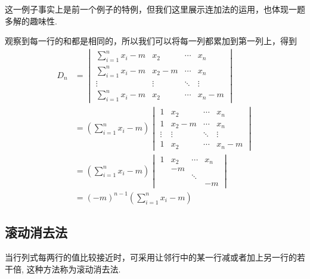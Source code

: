 这一例子事实上是前一个例子的特例，但我们这里展示连加法的运用，也体现一题多解的趣味性.

\begin{solution}
    观察到每一行的和都是相同的，所以我们可以将每一列都累加到第一列上，得到
    \begin{align*}
        D_n & =\begin{vmatrix}
                   \displaystyle\sum_{i=1}^{n} x_i-m & x_2    & \cdots & x_n    \\
                   \displaystyle\sum_{i=1}^{n} x_i-m & x_2-m  & \cdots & x_n    \\
                   \vdots                            & \vdots & \ddots & \vdots \\
                   \displaystyle\sum_{i=1}^{n} x_i-m & x_2    & \cdots & x_n-m
               \end{vmatrix} \\
            & =\left(\sum_{i=1}^{n} x_i-m\right)
        \begin{vmatrix}
            1      & x_2    & \cdots & x_n    \\
            1      & x_2-m  & \cdots & x_n    \\
            \vdots & \vdots & \ddots & \vdots \\
            1      & x_2    & \cdots & x_n-m
        \end{vmatrix}                                   \\
            & =\left(\sum_{i=1}^{n} x_i-m\right)
        \begin{vmatrix}
            1 & x_2 & \cdots & x_n \\
              & -m  &        &     \\
              &     & \ddots &     \\
              &     &        & -m
        \end{vmatrix}                                              \\
            & =(-m)^{n-1}\left(\sum_{i=1}^{n} x_i-m\right)
    \end{align*}
\end{solution}

\subsection{滚动消去法}

当行列式每两行的值比较接近时，可采用让邻行中的某一行减或者加上另一行的若干倍, 这种方法称为滚动消去法.

